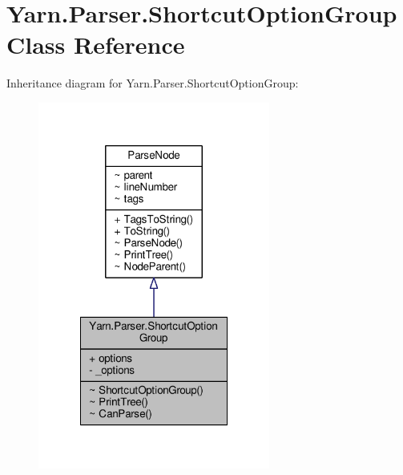 \hypertarget{a00136}{\section{Yarn.\-Parser.\-Shortcut\-Option\-Group Class Reference}
\label{a00136}
}


Inheritance diagram for Yarn.\-Parser.\-Shortcut\-Option\-Group\-:
\nopagebreak
\begin{figure}[H]
\begin{center}
\leavevmode
\includegraphics[width=216pt]{d6/dfa/a00626}
\end{center}
\end{figure}


